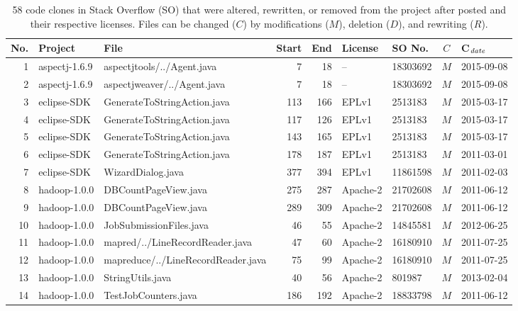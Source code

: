 \documentclass{sig-alternate-05-2015}
\begin{document}
\begin{table}
	\centering
	\caption{58 code clones in Stack Overflow (SO) that were altered, rewritten, or removed from the project after posted and their respective licenses. Files can be changed ($C$) by modifications ($M$), deletion ($D$), and rewriting ($R$).}
	\label{tab:stale_code_details}
	\scriptsize
	\begin{tabular}{r|l|p{4.5cm}|r|r|l|l|c|l}
		\hline 
		No. & Project & File & Start & End & License & SO No. & $C$ & C$_{\textit{\textrm{date}}}$ \\
		\hline
			1 & aspectj-1.6.9  & aspectjtools/../Agent.java  & 7 & 18 & -- & 18303692 & $M$  & 2015-09-08 \\
			2 & aspectj-1.6.9  & aspectjweaver/../Agent.java  & 7 & 18 & -- & 18303692 & $M$  & 2015-09-08 \\
			3 & eclipse-SDK  & GenerateToStringAction.java  & 113 & 166 & EPLv1 & 2513183 & $M$  &  2015-03-17 \\
			4 & eclipse-SDK  & GenerateToStringAction.java  & 117 & 126 & EPLv1  &  2513183	 & $M$  &  2015-03-17 \\
			5 & eclipse-SDK  & GenerateToStringAction.java  & 143 & 165 & EPLv1  &  2513183	 & $M$  &  2015-03-17 \\
			6 & eclipse-SDK  & GenerateToStringAction.java  & 178 & 187 & EPLv1  &  2513183	 & $M$  & 2011-03-01 \\
			7 & eclipse-SDK  & WizardDialog.java  & 377 & 394 & EPLv1  &   11861598	 & $M$  &  2011-02-03 \\
			8 & hadoop-1.0.0  & DBCountPageView.java  & 275 & 287 & Apache-2 & 21702608 & $M$  & 2011-06-12 \\
			9 & hadoop-1.0.0  & DBCountPageView.java  & 289 & 309 & Apache-2 & 21702608 & $M$  & 2011-06-12 \\
			10 & hadoop-1.0.0  & JobSubmissionFiles.java  & 46 & 55 & Apache-2 & 14845581 & $M$  & 2012-06-25 \\
			11 & hadoop-1.0.0  & mapred/../LineRecordReader.java  & 47 & 60 & Apache-2 & 16180910 & $M$  & 2011-07-25 \\
			12 & hadoop-1.0.0  & mapreduce/../LineRecordReader.java  & 75 & 99 & Apache-2 & 16180910 & $M$  & 2011-07-25 \\
			13 & hadoop-1.0.0  & StringUtils.java  & 40 & 56 & Apache-2 & 801987 & $M$  & 2013-02-04 \\
			14 & hadoop-1.0.0  & TestJobCounters.java  & 186 & 192 & Apache-2 & 18833798 & $M$  & 2011-06-12 \\

\end{tabular}
\end{table}
\end{document}
